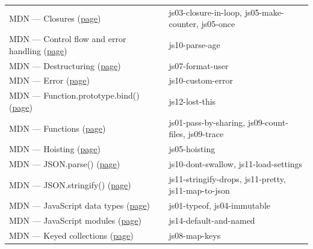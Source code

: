 \documentclass[10pt]{article}
\begin{document}
{\begin{tabularx}{\linewidth}{@{}p{2.2in}X@{}}
MDN — Closures (\href{https://developer.mozilla.org/en-US/docs/Web/JavaScript/Guide/Closures}{page}) & js03-closure-in-loop, js05-make-counter, js05-once\\
MDN — Control flow and error handling (\href{https://developer.mozilla.org/en-US/docs/Web/JavaScript/Guide/Control_flow_and_error_handling}{page}) & js10-parse-age\\
MDN — Destructuring (\href{https://developer.mozilla.org/en-US/docs/Web/JavaScript/Reference/Operators/Destructuring}{page}) & js07-format-user\\
MDN — Error (\href{https://developer.mozilla.org/en-US/docs/Web/JavaScript/Reference/Global_Objects/Error}{page}) & js10-custom-error\\
MDN — Function.prototype.bind() (\href{https://developer.mozilla.org/en-US/docs/Web/JavaScript/Reference/Global_Objects/Function/bind}{page}) & js12-lost-this\\
MDN — Functions (\href{https://developer.mozilla.org/en-US/docs/Web/JavaScript/Guide/Functions}{page}) & js01-pass-by-sharing, js09-count-files, js09-trace\\
MDN — Hoisting (\href{https://developer.mozilla.org/en-US/docs/Glossary/Hoisting}{page}) & js05-hoisting\\
MDN — JSON.parse() (\href{https://developer.mozilla.org/en-US/docs/Web/JavaScript/Reference/Global_Objects/JSON/parse}{page}) & js10-dont-swallow, js11-load-settings\\
MDN — JSON.stringify() (\href{https://developer.mozilla.org/en-US/docs/Web/JavaScript/Reference/Global_Objects/JSON/stringify}{page}) & js11-stringify-drops, js11-pretty, js11-map-to-json\\
MDN — JavaScript data types (\href{https://developer.mozilla.org/en-US/docs/Web/JavaScript/Guide/Data_structures}{page}) & js01-typeof, js04-immutable\\
MDN — JavaScript modules (\href{https://developer.mozilla.org/en-US/docs/Web/JavaScript/Guide/Modules}{page}) & js14-default-and-named\\
MDN — Keyed collections (\href{https://developer.mozilla.org/en-US/docs/Web/JavaScript/Guide/Keyed_collections}{page}) & js08-map-keys\\
\bottomrule\end{tabularx}}
\end{document}
